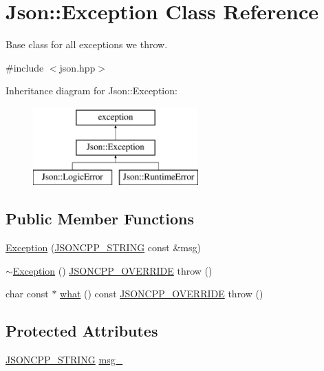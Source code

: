 \hypertarget{classJson_1_1Exception}{}\section{Json\+:\+:Exception Class Reference}
\label{classJson_1_1Exception}


Base class for all exceptions we throw.  




{\ttfamily \#include $<$json.\+hpp$>$}

Inheritance diagram for Json\+:\+:Exception\+:\begin{figure}[H]
\begin{center}
\leavevmode
\includegraphics[height=3.000000cm]{classJson_1_1Exception}
\end{center}
\end{figure}
\subsection*{Public Member Functions}
\begin{DoxyCompactItemize}
\item 
\hyperlink{classJson_1_1Exception_ae764aa42e0755bd4ce9d303e2733fa8f}{Exception} (\hyperlink{json_8hpp_a1e723f95759de062585bc4a8fd3fa4be}{J\+S\+O\+N\+C\+P\+P\+\_\+\+S\+T\+R\+I\+NG} const \&msg)
\item 
\hyperlink{classJson_1_1Exception_ab104964e6e77fdfccc5d1a24327fffe0}{$\sim$\+Exception} () \hyperlink{json_8hpp_a824d6199c91488107e443226fa6022c5}{J\+S\+O\+N\+C\+P\+P\+\_\+\+O\+V\+E\+R\+R\+I\+DE}  throw ()
\item 
char const $\ast$ \hyperlink{classJson_1_1Exception_a5a9ed7d91b828b9be81706ef9d483ed6}{what} () const \hyperlink{json_8hpp_a824d6199c91488107e443226fa6022c5}{J\+S\+O\+N\+C\+P\+P\+\_\+\+O\+V\+E\+R\+R\+I\+DE}  throw ()
\end{DoxyCompactItemize}
\subsection*{Protected Attributes}
\begin{DoxyCompactItemize}
\item 
\hyperlink{json_8hpp_a1e723f95759de062585bc4a8fd3fa4be}{J\+S\+O\+N\+C\+P\+P\+\_\+\+S\+T\+R\+I\+NG} \hyperlink{classJson_1_1Exception_aae3cbb8b45bf21480f64502a8329659f}{msg\+\_\+}
\end{DoxyCompactItemize}


